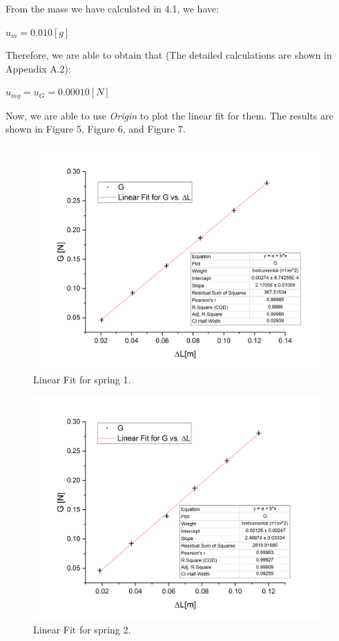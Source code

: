 \documentclass[a4paper,12pt]{article}
\begin{document}
\newpage
From the mass we have calculated in 4.1, we have:
\begin{center}
$ u_m = 0.010 [g] $
\end{center}
Therefore, we are able to obtain that (The detailed calculations are shown in Appendix A.2): 
\begin{center}
$ u_{mg} = u_G = 0.00010 [N]$
\end{center}

\par Now, we are able to use \textit{Origin} to plot the linear fit for them. The results are shown in Figure 5, Figure 6, and Figure 7.

\begin{figure}[p] 
    \centering
    \includegraphics[width=1\textwidth]{pic1} 
    \caption{Linear Fit for spring 1.} 
\end{figure}

\begin{figure}[p] 
    \centering
    \includegraphics[width=1\textwidth]{pic2} 
    \caption{Linear Fit for spring 2.} 
\end{figure}
\end{document}
